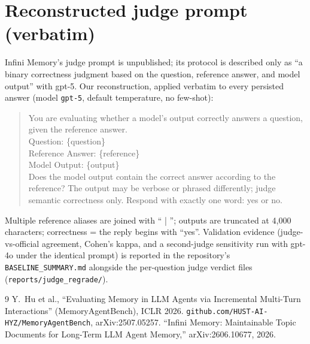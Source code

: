 \documentclass{article}
\newcommand{\mab}{MemoryAgentBench}
\begin{document}
\appendix
\section{Reconstructed judge prompt (verbatim)}
\label{app:judge}
Infini Memory's judge prompt is unpublished; its protocol is described only as
``a binary correctness judgment based on the question, reference answer, and
model output'' with gpt-5. Our reconstruction, applied verbatim to every
persisted answer (model \texttt{gpt-5}, default temperature, no few-shot):

\begin{quote}\raggedright\small\ttfamily
You are evaluating whether a model's output correctly answers a question,
given the reference answer.\\[4pt]
Question: \{question\}\\[2pt]
Reference Answer: \{reference\}\\[2pt]
Model Output: \{output\}\\[4pt]
Does the model output contain the correct answer according to the reference?
The output may be verbose or phrased differently; judge semantic correctness
only. Respond with exactly one word: yes or no.
\end{quote}

Multiple reference aliases are joined with `` | ''; outputs are truncated at
4{,}000 characters; correctness = the reply begins with ``yes''. Validation
evidence (judge-vs-official agreement, Cohen's kappa, and a second-judge
sensitivity run with gpt-4o under the identical prompt) is reported in the
repository's \texttt{BASELINE\_SUMMARY.md} alongside the per-question judge
verdict files (\texttt{reports/judge\_regrade/}).

\begin{thebibliography}{9}
Y.~Hu et al.,
``Evaluating Memory in LLM Agents via Incremental Multi-Turn Interactions''
(\mab{}), ICLR 2026. \texttt{github.com/HUST-AI-HYZ/MemoryAgentBench},
arXiv:2507.05257.
``Infini Memory: Maintainable Topic Documents for Long-Term LLM Agent
Memory,'' arXiv:2606.10677, 2026.
\end{thebibliography}
\end{document}
